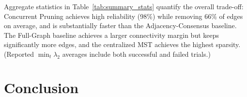 \documentclass[conference]{IEEEconf}
\theoremstyle{plain}
\begin{document}
Aggregate statistics in Table~\ref{tab:summary_stats} quantify the overall trade-off: Concurrent Pruning achieves high reliability (98\%)
while removing $66\%$ of edges on average, and is substantially faster than the Adjacency-Consensus baseline. The Full-Graph baseline
achieves a larger connectivity margin but keeps significantly more edges, and the centralized MST achieves the highest sparsity. (Reported $\min_t\lambda_2$ averages include both successful and failed trials.)

\begin{table}[H]
\centering
\caption{Aggregate performance across all scenarios (10 Monte-Carlo trials per scenario).}
\label{tab:summary_stats}
\footnotesize
\setlength{\tabcolsep}{2.4pt}
\end{table}
\FloatBarrier

\section{Conclusion}
\label{sec:conclusion}
\end{document}
